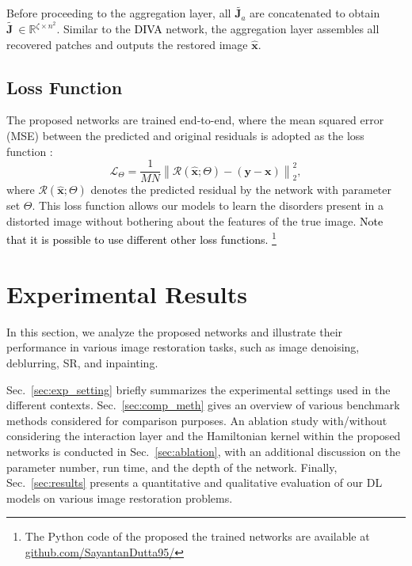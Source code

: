 \documentclass[10pt,journal,compsoc]{IEEEtran}
\newcommand{\norm}[1]{\left\lVert #1 \right\rVert}
\newcommand{\dk}{\textcolor{black}}
\def\bsx{{\boldsymbol{x}}}
\def\bsy{{\boldsymbol{y}}}
\def\bsJ{{\boldsymbol{J}}}
\begin{document}
Before proceeding to the aggregation layer, all $\tilde{\bsJ_a}$ are concatenated to obtain $\tilde{\bsJ~} \in \mathbb{R}^{\zeta \times n^2}$. Similar to the \dk{DIVA} network, the aggregation layer assembles all recovered patches and outputs the restored image $\hat{\bsx}$.



\subsection{Loss Function}
\label{sec:loss_func}
The proposed networks are trained end-to-end, where the mean squared error (MSE) between the predicted and original residuals is adopted as the loss function \cite{Yang2018bm3dnet}:
\begin{equation}
\mathcal{L}_\Theta = \dfrac{1}{MN} \norm { \mathcal{R}(\hat{\bsx}; \Theta)  - (\bsy - \bsx) }^2_2,
\label{eq:loss_fun}
\end{equation}
where $\mathcal{R}(\hat{\bsx}; \Theta)$ denotes the predicted residual by the network with parameter set $\Theta$. This loss function allows our models to learn the disorders present in a distorted image without bothering about the features of the true image.
\dk{Note that it is possible to use different other loss functions.}
\footnote{The Python code of the proposed the trained networks are available at \href{https://github.com/SayantanDutta95/}{github.com/SayantanDutta95/}}




\section{Experimental Results}
\label{sec:expe_results}
In this section, we analyze the proposed networks and illustrate their performance in various image restoration tasks, such as image denoising, deblurring, SR, and inpainting.

Sec.~\ref{sec:exp_setting} briefly summarizes the experimental settings used in the different contexts. Sec.~\ref{sec:comp_meth} gives an overview of various benchmark methods considered for comparison purposes. An ablation study with/without considering the interaction layer and the Hamiltonian kernel within the proposed networks is conducted in Sec.~\ref{sec:ablation}, with an additional discussion on the parameter number, run time, and the depth of the network. Finally, Sec.~\ref{sec:results} presents a quantitative and qualitative evaluation of our DL models on various image restoration problems.
\end{document}
